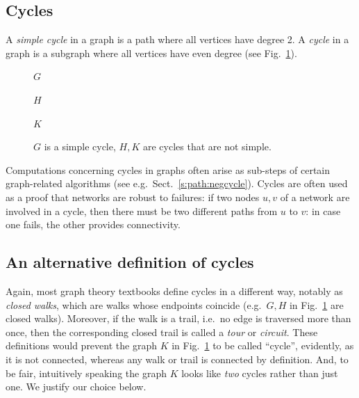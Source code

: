 \documentclass[a4paper]{book}
\theoremstyle{changebreak}                %
\begin{document}
\subsection{Cycles}
A {\it simple cycle} in a graph is a path where
all vertices have degree 2. A {\it cycle} in a graph is a subgraph
where all vertices have even degree (see Fig.~\ref{f:cycle}).
\begin{figure}[!ht]
\begin{center}
\begin{minipage}{4cm}
$G$
\end{minipage}
\hspace*{0.5cm}
\begin{minipage}{4cm}
$H$
\end{minipage}
\hspace*{0.5cm}
\begin{minipage}{4cm}
$K$
\end{minipage}
\end{center}
\caption{$G$ is a simple cycle, $H,K$ are cycles that are not simple.}
\label{f:cycle}
\end{figure}

Computations concerning cycles in graphs often arise as sub-steps of
certain graph-related algorithms (see
e.g.~Sect.~\ref{s:path:negcycle}). Cycles are often used as a proof
that networks are robust to failures: if two nodes $u,v$ of a network
are involved in a cycle, then there must be two different paths from
$u$ to $v$: in case one fails, the other provides connectivity.

\subsection{An alternative definition of cycles}
\label{s:graph:altcycle}
Again, most graph theory textbooks define cycles in a different way,
notably as {\it closed walks}, which are walks
whose endpoints coincide (e.g.~$G,H$ in Fig.~\ref{f:cycle} are closed
walks). Moreover, if the walk is a trail, i.e.~no edge is
traversed more than once, then the corresponding closed trail is
called a {\it tour} or {\it circuit}. These
definitions would prevent the graph $K$ in Fig.~\ref{f:cycle} to be
called ``cycle'', evidently, as it is not connected, whereas any walk
or trail is connected by definition. And, to be fair, intuitively
speaking the graph $K$ looks like {\it two} cycles rather than just
one. We justify our choice below.
\end{document}
